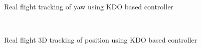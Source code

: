 \documentclass[letterpaper%
, twoside%
, 12pt%
,memoire%
, english%
,creativecommons,hyperref%
]{thETS}
\begin{document}
\begin{figure}[H]
	\centering
	 \\ \parbox{0.75\textwidth}{\caption{Real flight tracking of yaw using KDO based controller\label{Fig:yawtracKDO}}}
\end{figure}
\begin{figure}[H]
	\centering
	 \\ \parbox{0.75\textwidth}{\caption{Real flight 3D tracking of position using KDO based controller\label{Fig:3dKDO}}}
\end{figure}
\FloatBarrier
\end{document}
